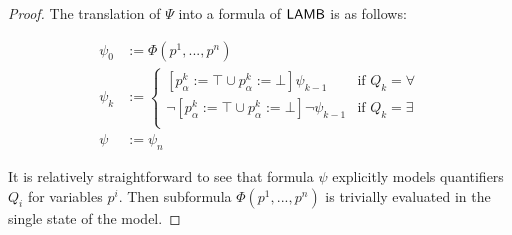 \begin{proof}
The translation of $\Psi$ into a formula of $\mathsf{LAMB}$ is as follows:

\begin{align*}
    \psi_0 &:= \Phi(p^1, ..., p^n) \\
    \psi_k &:=
    \begin{cases}
        [p^k_\alpha:= \top \cup p^k_\alpha := \bot] \psi_{k-1} &\text{if } Q_k = \forall\\ 
        \lnot [p^k_\alpha:= \top \cup p^k_\alpha := \bot] \lnot \psi_{k-1} &\text{if } Q_k = \exists\\
    \end{cases}\\
\psi &:= \psi_n
\end{align*}

It is relatively straightforward to see that formula $\psi$ explicitly models quantifiers $Q_i$ for variables $p^i$. Then subformula  $\Phi(p^1, ..., p^n)$ is trivially evaluated in the single state of the model. 
\end{proof}




